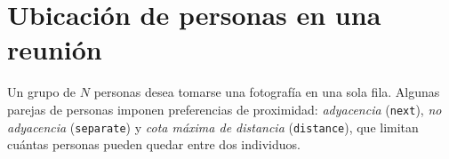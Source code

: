 
\section{Ubicación de personas en una reunión}\label{sec:05-reunion}
Un grupo de \(N\) personas desea tomarse una fotografía en una sola fila. Algunas parejas de personas imponen preferencias de proximidad: \emph{adyacencia} (\texttt{next}), \emph{no adyacencia} (\texttt{separate}) y \emph{cota máxima de distancia} (\texttt{distance}), que limitan cuántas personas pueden quedar entre dos individuos.